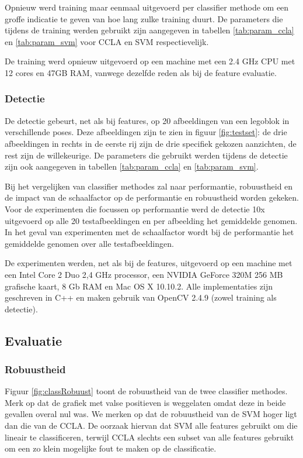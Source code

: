 Opnieuw werd training maar eenmaal uitgevoerd per classifier methode om een groffe indicatie te geven van hoe lang zulke training duurt. De parameters die tijdens de training werden gebruikt zijn aangegeven in tabellen \ref{tab:param_ccla} en \ref{tab:param_svm} voor CCLA en SVM respectievelijk. 

De training werd opnieuw uitgevoerd op een machine met een 2.4 GHz CPU met 12 cores en 47GB RAM, vanwege dezelfde reden als bij de feature evaluatie.

\subsubsection*{Detectie}

De detectie gebeurt, net als bij features, op 20 afbeeldingen van een legoblok in verschillende poses. Deze afbeeldingen zijn te zien in figuur \ref{fig:testset}: de drie afbeeldingen in rechts in de eerste rij zijn de drie specifiek gekozen aanzichten, de rest zijn de willekeurige. De parameters die gebruikt werden tijdens de detectie zijn ook aangegeven in tabellen \ref{tab:param_ccla} en \ref{tab:param_svm}.

Bij het vergelijken van classifier methodes zal naar performantie, robuustheid en de impact van de schaalfactor op de performantie en robuustheid worden gekeken. Voor de experimenten die focussen op performantie werd de detectie 10x uitgevoerd op alle 20 testafbeeldingen en per afbeelding het gemiddelde genomen. In het geval van experimenten met de schaalfactor wordt bij de performantie het gemiddelde genomen over alle testafbeeldingen.

De experimenten werden, net als bij de features, uitgevoerd op een machine met een Intel Core 2 Duo 2,4 GHz processor, een NVIDIA GeForce 320M 256 MB grafische kaart, 8 Gb RAM en Mac OS X 10.10.2. Alle implementaties zijn geschreven in C++ en maken gebruik van OpenCV 2.4.9 (zowel training als detectie).

\subsection{Evaluatie}

\subsubsection*{Robuustheid}

Figuur \ref{fig:classRobuust} toont de robuustheid van de twee classifier methodes. Merk op dat de grafiek met valse positieven is weggelaten omdat deze in beide gevallen overal nul was. We merken op dat de robuustheid van de SVM hoger ligt dan die van de CCLA. De oorzaak hiervan dat SVM alle features gebruikt om die lineair te classificeren, terwijl CCLA slechts een subset van alle features gebruikt om een zo klein mogelijke fout te maken op de classificatie.

